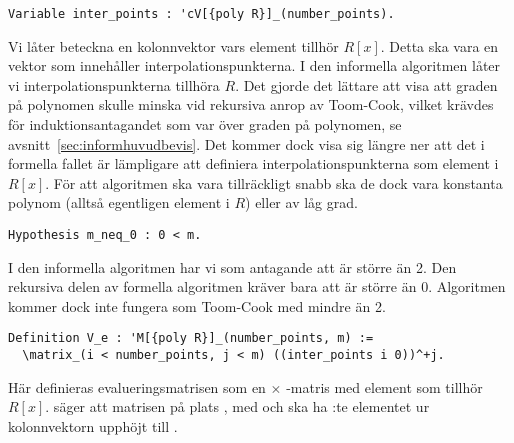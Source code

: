 
\begin{lstlisting}
Variable inter_points : 'cV[{poly R}]_(number_points).
\end{lstlisting}

Vi låter  beteckna en kolonnvektor vars element tillhör $R[x]$.
Detta ska vara en vektor som innehåller interpolationspunkterna. I den
informella algoritmen låter vi interpolationspunkterna tillhöra $R$. Det gjorde
det lättare att visa att graden på polynomen skulle minska vid rekursiva anrop
av Toom-Cook, vilket krävdes för induktionsantagandet som var över graden på
polynomen, se avsnitt~\ref{sec:informhuvudbevis}. Det kommer dock visa sig
längre ner att det i formella fallet är lämpligare att definiera
interpolationspunkterna som element i $R[x]$. För att algoritmen ska vara
tillräckligt snabb ska de dock vara konstanta polynom (alltså egentligen
element i $R$) eller av låg grad.


\begin{lstlisting}
Hypothesis m_neq_0 : 0 < m.
\end{lstlisting}

I den informella algoritmen har vi som antagande att  är större än 2. Den
rekursiva delen av formella algoritmen kräver bara att  är större än 0.
Algoritmen kommer dock inte fungera som Toom-Cook med  mindre än 2.

\begin{lstlisting}
Definition V_e : 'M[{poly R}]_(number_points, m) :=
  \matrix_(i < number_points, j < m) ((inter_points i 0))^+j.
\end{lstlisting}
Här definieras evalueringsmatrisen  som en  $\times$
-matris med element som tillhör $R[x]$.
 säger att matrisen
på plats , med  och  ska ha :te
elementet ur kolonnvektorn  upphöjt till .

